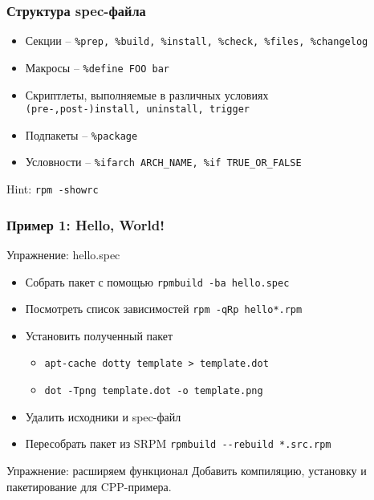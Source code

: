 \begin{frame}
	\frametitle{Структура spec-файла}

	\begin{itemize}
		\item Секции --  {\tt \%prep, \%build, \%install, \%check, \%files, \%changelog} 
		\item Макросы -- {\tt \%define FOO bar} 
		\item Скриптлеты, выполняемые в различных условиях\\
			{\tt (pre-,post-)install, uninstall, trigger}
		\item Подпакеты -- {\tt \%package}
		\item Условности -- {\tt \%ifarch ARCH\_NAME, \%if TRUE\_OR\_FALSE}
	\end{itemize}
	\begin{block}{Hint:}
		 {\tt rpm -\-showrc }
	\end{block}
\end{frame}

\begin{frame}
	\frametitle{Пример 1: Hello, World!}

	\begin{block}{Упражнение: hello.spec}
		\begin{itemize}
			\item Собрать пакет с помощью {\tt rpmbuild -ba hello.spec}
			\item Посмотреть список зависимостей {\tt rpm -qRp hello*.rpm}
			\item Установить полученный пакет
			\begin{itemize}
				\item {\tt apt-cache dotty template > template.dot}
				\item {\tt dot -Tpng template.dot -o template.png}
			\end{itemize}
			\item Удалить исходники и spec-файл
			\item Пересобрать пакет из SRPM {\tt rpmbuild -{}-rebuild *.src.rpm}
		\end{itemize}
	\end{block}

	\pause

	\begin{block}{Упражнение: расширяем функционал}
		Добавить компиляцию, установку и пакетирование для CPP-примера.
	\end{block}

\end{frame}


